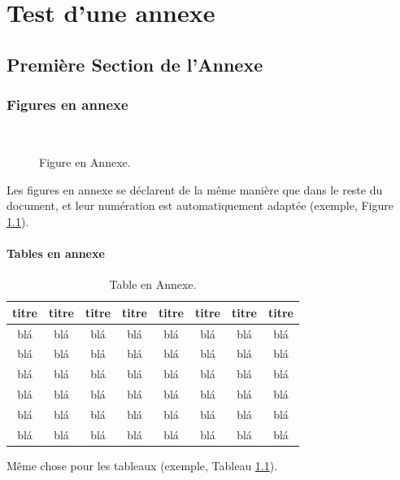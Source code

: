 

\chapter{Test d'une annexe} 


\section{Première Section de l'Annexe}


\subsection{Figures en annexe}

\begin{figure}
	\centering
	 \\ \parbox{0.75\textwidth}{\caption{Figure en Annexe.}\label{fig:testAp}}
\end{figure}

Les figures en annexe se déclarent de la même manière que dans le reste du document, et leur numération est automatiquement adaptée (exemple, Figure \ref{fig:testAp}).

\subsubsection{Tables en annexe}

\begin{table}
		\parbox{0.65\textwidth}{\caption{Table en Annexe.}\label{tab:testAp}}

		\begin{tabular}{|c|c|c|c|c|c|c|c|}
		\hline
			{\bf titre} & {\bf titre} & {\bf titre} & {\bf titre} & {\bf titre} & {\bf titre} & {\bf titre} & {\bf titre} \\
	  \hline
			blá & blá & blá & blá & blá & blá & blá & blá \\
	  \hline
			blá & blá & blá & blá & blá & blá & blá & blá \\
	  \hline
			blá & blá & blá & blá & blá & blá & blá & blá \\
	  \hline
			blá & blá & blá & blá & blá & blá & blá & blá \\
	  \hline
			blá & blá & blá & blá & blá & blá & blá & blá \\
	  \hline
			blá & blá & blá & blá & blá & blá & blá & blá \\
	  \hline
		\end{tabular}
\end{table}

Même chose pour les tableaux (exemple, Tableau \ref{tab:testAp}).